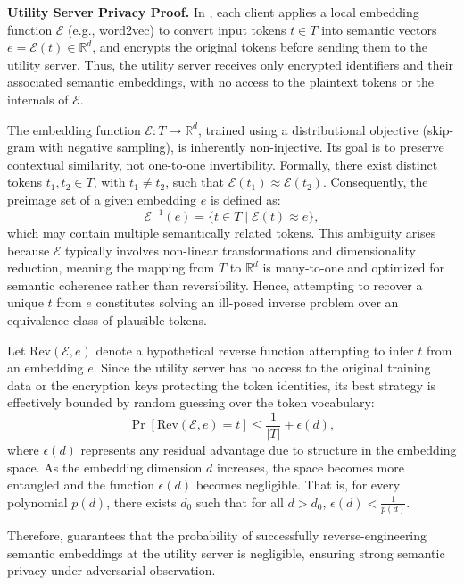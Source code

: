 \textbf{Utility Server Privacy Proof.}  
In \Sys, each client applies a local embedding function \(\mathcal{E}\) (e.g., word2vec) to convert input tokens \(t \in T\) into semantic vectors \(e = \mathcal{E}(t) \in \mathbb{R}^d\), and encrypts the original tokens before sending them to the utility server. Thus, the utility server receives only encrypted identifiers and their associated semantic embeddings, with no access to the plaintext tokens or the internals of \(\mathcal{E}\).

The embedding function \(\mathcal{E}: T \to \mathbb{R}^d\), trained using a distributional objective (skip-gram with negative sampling), is inherently non-injective. Its goal is to preserve contextual similarity, not one-to-one invertibility. Formally, there exist distinct tokens \(t_1, t_2 \in T\), with \(t_1 \neq t_2\), such that \(\mathcal{E}(t_1) \approx \mathcal{E}(t_2)\). Consequently, the preimage set of a given embedding \(e\) is defined as:
\[
\mathcal{E}^{-1}(e) = \{t \in T \mid \mathcal{E}(t) \approx e\},
\]
which may contain multiple semantically related tokens. This ambiguity arises because \(\mathcal{E}\) typically involves non-linear transformations and dimensionality reduction, meaning the mapping from \(T\) to \(\mathbb{R}^d\) is many-to-one and optimized for semantic coherence rather than reversibility. Hence, attempting to recover a unique \(t\) from \(e\) constitutes solving an ill-posed inverse problem over an equivalence class of plausible tokens.

Let \(\text{Rev}(\mathcal{E}, e)\) denote a hypothetical reverse function attempting to infer \(t\) from an embedding \(e\). Since the utility server has no access to the original training data or the encryption keys protecting the token identities, its best strategy is effectively bounded by random guessing over the token vocabulary:
\[
\Pr[\text{Rev}(\mathcal{E}, e) = t] \leq \frac{1}{|T|} + \epsilon(d),
\]
where \(\epsilon(d)\) represents any residual advantage due to structure in the embedding space. As the embedding dimension \(d\) increases, the space becomes more entangled and the function \(\epsilon(d)\) becomes negligible. That is, for every polynomial \(p(d)\), there exists \(d_0\) such that for all \(d > d_0\), \(\epsilon(d) < \frac{1}{p(d)}\).

Therefore, \Sys guarantees that the probability of successfully reverse-engineering semantic embeddings at the utility server is negligible, ensuring strong semantic privacy under adversarial observation.

